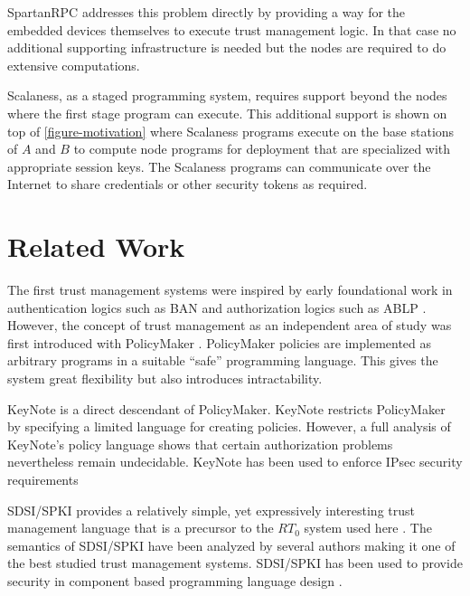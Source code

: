 SpartanRPC addresses this problem directly by providing a way for the embedded devices
themselves to execute trust management logic. In that case no additional supporting
infrastructure is needed but the nodes are required to do extensive computations.

Scalaness, as a staged programming system, requires support beyond the nodes where the first
stage program can execute. This additional support is shown on top of
\autoref{figure-motivation} where Scalaness programs execute on the base stations of $A$ and $B$
to compute node programs for deployment that are specialized with appropriate session keys. The
Scalaness programs can communicate over the Internet to share credentials or other security
tokens as required.

\section{Related Work}


The first trust management systems were inspired by early foundational work in authentication
logics such as BAN \cite{Burrows:LA} and authorization logics such as ABLP \cite{Abadi:CACDS}.
However, the concept of trust management as an independent area of study was first introduced
with PolicyMaker \cite{Blaze:DTM,Blaze:CCPTMS}. PolicyMaker policies are implemented as
arbitrary programs in a suitable ``safe'' programming language. This gives the system great
flexibility but also introduces intractability.

KeyNote \cite{RFC-2704} is a direct descendant of PolicyMaker. KeyNote restricts PolicyMaker by
specifying a limited language for creating policies. However, a full analysis of KeyNote's
policy language \cite{Li:DCFTML} shows that certain authorization problems nevertheless remain
undecidable. KeyNote has been used to enforce IPsec security requirements
\cite{Blaze:TMIPS,Blaze:EKTMS}

SDSI/SPKI \cite{Rivest:SDSI-11,RFC-2693} provides a relatively simple, yet expressively
interesting trust management language that is a precursor to the $RT_0$ system used here
. The semantics of SDSI/SPKI have
been analyzed by several authors
\cite{Abadi:OSLLNS,Halpern:LSSLLNS,Howell:FSS,Li:LNSS,Clarke:CCDSS} making it one of the best
studied trust management systems. SDSI/SPKI has been used to provide security in component based
programming language design \cite{Liu:CSI}.

